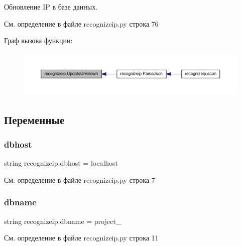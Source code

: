 Обновление IP в базе данных. 



См. определение в файле recognizeip.\+py строка 76

Граф вызова функции\+:\nopagebreak
\begin{figure}[H]
\begin{center}
\leavevmode
\includegraphics[width=350pt]{namespacerecognizeip_a7055bdccbd846aa71a7be77513548e08_icgraph}
\end{center}
\end{figure}


\subsection{Переменные}
\mbox{\label{namespacerecognizeip_ab088007f4af084f71c33ab23b8aa59fe}} 
\subsubsection{\texorpdfstring{dbhost}{dbhost}}
{\footnotesize\ttfamily string recognizeip.\+dbhost = \textquotesingle{}localhost\textquotesingle{}}



См. определение в файле recognizeip.\+py строка 7

\mbox{\label{namespacerecognizeip_a114539cfda8487773400a49df2653b25}} 
\subsubsection{\texorpdfstring{dbname}{dbname}}
{\footnotesize\ttfamily string recognizeip.\+dbname = \textquotesingle{}project\+\_\textquotesingle{}}



См. определение в файле recognizeip.\+py строка 11

\mbox{\label{namespacerecognizeip_a4ed50ea7f07921938765ea73e8131467}} 
